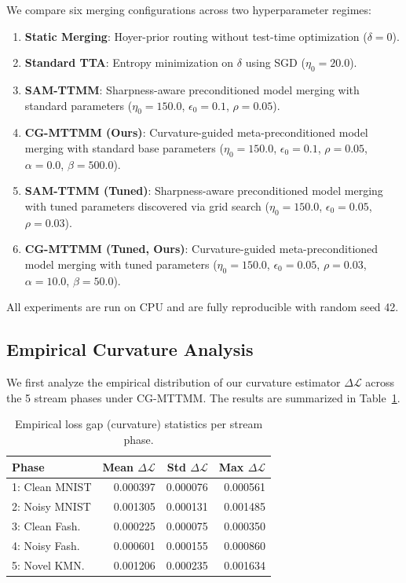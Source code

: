 \documentclass{article}
\theoremstyle{plain}
\theoremstyle{definition}
\theoremstyle{remark}
\begin{document}
We compare six merging configurations across two hyperparameter regimes:
\begin{enumerate}
\item \textbf{Static Merging}: Hoyer-prior routing without test-time optimization ($\delta = 0$).
\item \textbf{Standard TTA}: Entropy minimization on $\delta$ using SGD ($\eta_0 = 20.0$).
\item \textbf{SAM-TTMM}: Sharpness-aware preconditioned model merging with standard parameters ($\eta_0 = 150.0$, $\epsilon_0 = 0.1$, $\rho = 0.05$).
\item \textbf{CG-MTTMM (Ours)}: Curvature-guided meta-preconditioned model merging with standard base parameters ($\eta_0 = 150.0$, $\epsilon_0 = 0.1$, $\rho = 0.05$, $\alpha = 0.0$, $\beta = 500.0$).
\item \textbf{SAM-TTMM (Tuned)}: Sharpness-aware preconditioned model merging with tuned parameters discovered via grid search ($\eta_0 = 150.0$, $\epsilon_0 = 0.05$, $\rho = 0.03$).
\item \textbf{CG-MTTMM (Tuned, Ours)}: Curvature-guided meta-preconditioned model merging with tuned parameters ($\eta_0 = 150.0$, $\epsilon_0 = 0.05$, $\rho = 0.03$, $\alpha = 10.0$, $\beta = 50.0$).
\end{enumerate}
All experiments are run on CPU and are fully reproducible with random seed 42.

\subsection{Empirical Curvature Analysis}
We first analyze the empirical distribution of our curvature estimator $\Delta \mathcal{L}$ across the 5 stream phases under CG-MTTMM. The results are summarized in Table~\ref{tab:curvature_stats}.

\begin{table}[h]
\caption{Empirical loss gap (curvature) statistics per stream phase.}
\label{tab:curvature_stats}
\centering
\begin{small}
\begin{tabular}{lrrr}
\toprule
\textbf{Phase} & \textbf{Mean $\Delta \mathcal{L}$} & \textbf{Std $\Delta \mathcal{L}$} & \textbf{Max $\Delta \mathcal{L}$} \\
\midrule
1: Clean MNIST & 0.000397 & 0.000076 & 0.000561 \\
2: Noisy MNIST & 0.001305 & 0.000131 & 0.001485 \\
3: Clean Fash. & 0.000225 & 0.000075 & 0.000350 \\
4: Noisy Fash. & 0.000601 & 0.000155 & 0.000860 \\
5: Novel KMN.  & 0.001206 & 0.000235 & 0.001634 \\
\bottomrule
\end{tabular}
\end{small}
\end{table}
\end{document}
